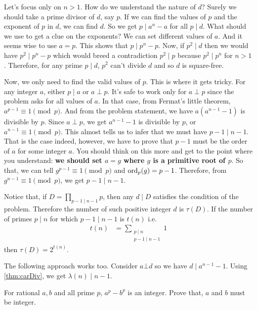 \documentclass[problems.tex]{subfile}
\begin{document}
	\begin{solution}
		Let's focus only on $n>1$. How do we understand the nature of $d$? Surely we should take a prime divisor of $d$, say $p$. If we can find the values of $p$ and the exponent of $p$ in $d$, we can find $d$. So we get $p\mid a^n-a$ for all $p\mid d$. What should we use to get a clue on the exponents? We can set different values of $a$. And it seems wise to use $a=p$. This shows that $p\mid p^n-p$. Now, if $p^2\mid d$ then we would have $p^2\mid p^n-p$ which would breed a contradiction $p^2\mid p$ because $p^2\mid p^n$ for $n>1$. Therefore, for any prime $p\mid d$, $p^2$ can't divide $d$ and so $d$ is square-free.

		Now, we only need to find the valid values of $p$. This is where it gets tricky. For any integer $a$, either $p\mid a$ or $a\perp p$. It's safe to work only for $a\perp p$ since the problem asks for all values of $a$. In that case, from Fermat's little theorem, $a^{p-1}\equiv1\pmod p$. And from the problem statement, we have $a(a^{n-1}-1)$ is divisible by $p$. Since $a\perp p$, we get $a^{n-1}-1$ is divisible by $p$, or $a^{n-1}\equiv1\pmod p$. This almost tells us to infer that we must have $p-1\mid n-1$. That is the case indeed, however, we have to prove that $p-1$ must be the order of $a$ for some integer $a$. You should think on this more and get to the point where you understand: \textbf{we should set $a=g$ where $g$ is a primitive root of $p$}. So that, we can tell $g^{p-1}\equiv1\pmod p$ and $\operatorname{ord}_p(g)=p-1$. Therefore, from $g^{n-1}\equiv1\pmod p$, we get $p-1\mid n-1$.

		Notice that, if $D=\prod\limits_{p-1\mid n-1}p$, then any $d\mid D$ satisfies the condition of the problem. Therefore the number of such positive integer $d$ is $\tau(D)$. If the number of primes $p\mid n$ for which $p-1\mid n-1$ is $t(n)$ i.e.
			\begin{align*}
				t(n) & = \sum\limits_{\substack{p\mid n\\p-1\mid n-1}}1
			\end{align*}
		then $\tau(D) = 2^{t(n)}$.
	\end{solution}

	\begin{note}
		The following approach works too. Consider $a\bot d$ so we have $d\mid a^{n-1}-1$. Using \autoref{thm:carDiv}, we get $\lambda(n)\mid n-1$.
	\end{note}

	\begin{problem}
		For rational $a,b$ and all prime $p$, $a^p-b^p$ is an integer. Prove that, $a$ and $b$ must be integer.
	\end{problem}
\end{document}
